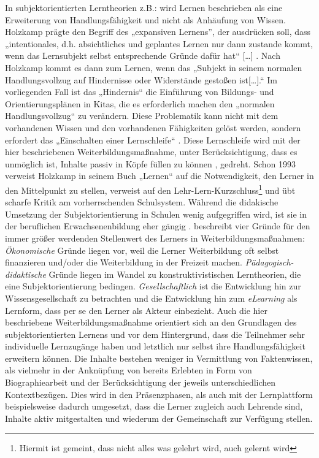 \documentclass[12pt,smallheadings, bibliography=totoc]{scrartcl}
\begin{document}
In subjektorientierten Lerntheorien z.B.: \parencite{Holzkamp2004} wird
Lernen beschrieben als eine Erweiterung von Handlungsfähigkeit und nicht
als Anhäufung von Wissen. Holzkamp prägte den Begriff des „expansiven
Lernens'', der ausdrücken soll, dass „intentionales, d.h. absichtliches
und geplantes Lernen nur dann zustande kommt, wenn das Lernsubjekt
selbst entsprechende Gründe dafür hat`` {[}\ldots{]}
\parencite[29]{Holzkamp2004}. Nach Holzkamp kommt es dann zum Lernen,
wenn das „Subjekt in seinem normalen Handlungsvollzug auf Hindernisse
oder Widerstände gestoßen ist{[}\ldots{]}.`` Im vorliegenden Fall ist
das „Hindernis`` die Einführung von Bildungs- und Orientierungsplänen in
Kitas, die es erforderlich machen den „normalen Handlungsvollzug`` zu
verändern. Diese Problematik kann nicht mit dem vorhandenen Wissen und
den vorhandenen Fähigkeiten gelöst werden, sondern erfordert das
„Einschalten einer Lernschleife`` \parencite[29]{Holzkamp2004}. Diese
Lernschleife wird mit der hier beschriebenen Weiterbildungsmaßnahme,
unter Berücksichtigung, dass es unmöglich ist, Inhalte passiv in Köpfe
füllen zu können \parencite[12]{Faulstich2012}, gedreht. Schon 1993
verweist Holzkamp in seinem Buch „Lernen`` auf die Notwendigkeit, den
Lerner in den Mittelpunkt zu stellen, verweist auf den
Lehr-Lern-Kurzschluss\footnote{Hiermit ist gemeint, dass nicht alles was gelehrt wird, auch gelernt wird}
und übt scharfe Kritik am vorherrschenden Schulsystem. Während die
didakische Umsetzung der Subjektorientierung in Schulen wenig
aufgegriffen wird, ist sie in der beruflichen Erwachsenenbildung eher
gängig \parencite{grotluschen2005expansives}.
\textcite[138]{ehlers2011qualitat} beschreibt vier Gründe für den immer
größer werdenden Stellenwert des Lerners in Weiterbildungsmaßnahmen:
\emph{Ökonomische} Gründe liegen vor, weil die Lerner Weiterbildung oft
selbst finanzieren und/oder die Weiterbildung in der Freizeit machen.
\emph{Pädagogisch-didaktische} Gründe liegen im Wandel zu
konstruktivistischen Lerntheorien, die eine Subjektorientierung
bedingen. \emph{Gesellschaftlich} ist die Entwicklung hin zur
Wissensgesellschaft zu betrachten und die Entwicklung hin zum
\emph{eLearning} als Lernform, dass per se den Lerner als Akteur
einbezieht. Auch die hier beschriebene Weiterbildungsmaßnahme orientiert
sich an den Grundlagen des subjektorientierten Lernens und vor dem
Hintergrund, dass die Teilnehmer sehr individuelle Lernzugänge haben und
letztlich nur selbst ihre Handlungsfähigkeit erweitern können. Die
Inhalte bestehen weniger in Vermittlung von Faktenwissen, als vielmehr
in der Anknüpfung von bereits Erlebten in Form von Biographiearbeit und
der Berücksichtigung der jeweils unterschiedlichen Kontextbezügen. Dies
wird in den Präsenzphasen, als auch mit der Lernplattform beispielsweise
dadurch umgesetzt, dass die Lerner zugleich auch Lehrende sind, Inhalte
aktiv mitgestalten und wiederum der Gemeinschaft zur Verfügung stellen.
\end{document}
